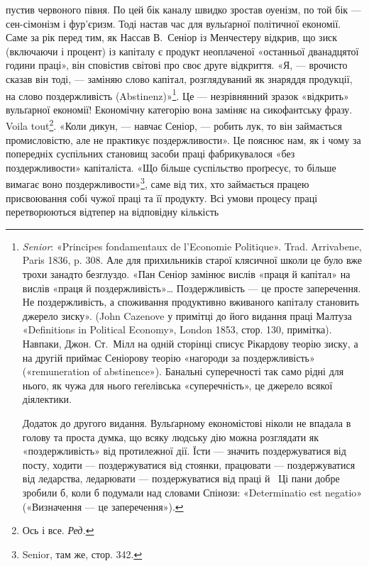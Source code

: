 \parcont{}  %
пустив червоного півня. По цей бік каналу швидко зростав оуенізм,
по той бік — сен-сімонізм і фур'єризм. Тоді настав час
для вульґарної політичної економії. Саме за рік перед тим, як
Нассав В.~Сеніор із Менчестеру відкрив, що зиск (включаючи
і процент) із капіталу є продукт неоплаченої «останньої дванадцятої
години праці», він сповістив світові про своє друге відкриття.
«Я, — врочисто сказав він тоді, — заміняю слово капітал,
розглядуваний як знаряддя продукції, на слово поздержливість
(Abstinenz)»\footnote{
\emph{Senior}: «Principes fondamentaux de l’Economie Politique». Trad.
Arrivabene, Paris 1836, p. 308. Але для прихильників старої клясичної
школи це було вже трохи занадто безглуздо. «Пан Сеніор замінює вислів
«праця й капітал» на вислів «праця й поздержливість»\dots{} Поздержливість
— це просте заперечення. Не поздержливість, а споживання продуктивно
вживаного капіталу становить джерело зиску». (John Cazenove
у примітці до його видання праці Малтуза «Definitions in Political
Economy», London 1853, стор. 130, примітка). Навпаки, Джон. Ст.~Мілл на одній сторінці списує Рікардову теорію зиску, а на другій приймає
Сеніорову теорію «нагороди за поздержливість» («remuneration
of abstinence»). Банальні суперечності так само рідні для нього, як чужа
для нього геґелівська «суперечність», це джерело всякої діялектики.

Додаток до другого видання. Вульґарному економістові ніколи не
впадала в голову та проста думка, що всяку людську дію можна розглядати
як «поздержливість» від протилежної дії. Їсти — значить поздержуватися
від посту, ходити — поздержуватися від стоянки, працювати —
поздержуватися від ледарства, ледарювати — поздержуватися від праці
й~ Ці пани добре зробили б, коли б подумали над словами Спінози:
«Determinatio est negatio» («Визначення — це заперечення»).
}. Це — незрівнянний зразок «відкрить» вульґарної
економії! Економічну категорію вона заміняє на сикофантську
фразу. Voila tout\footnote*{
Ось і все. \emph{Ред.}
}. «Коли дикун, — навчає Сеніор, — робить
лук, то він займається промисловістю, але не практикує
поздержливости». Це пояснює нам, як і чому за попередніх суспільних
становищ засоби праці фабрикувалося «без поздержливости»
капіталіста. «Що більше суспільство проґресує, то більше
вимагає воно поздержливости»\footnote{
Senior, там же, стор. 342.
}, саме від тих, хто займається
працею присвоювання собі чужої праці та її продукту. Всі умови
процесу праці перетворюються відтепер на відповідну кількість
